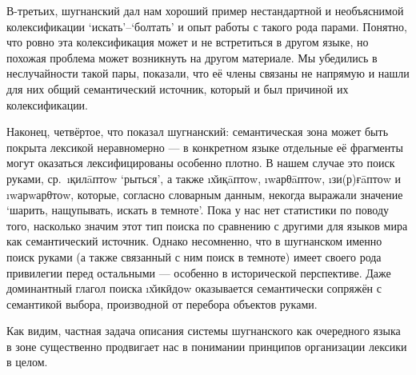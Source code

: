 В-третьих, шугнанский дал нам хороший пример нестандартной и необъяснимой колексификации ‘искать’–‘болтать’ и опыт работы с такого рода парами. Понятно, что ровно эта колексификация может и не встретиться в другом языке, но похожая проблема может возникнуть на другом материале. Мы убедились в неслучайности такой пары, показали, что её члены связаны не напрямую и нашли для них общий семантический источник, который и был причиной их колексификации.

\pagebreak[4]

Наконец, четвёртое, что показал шугнанский: семантическая зона может быть покрыта лексикой неравномерно — в конкретном языке отдельные её фрагменты могут оказаться лексифицированы особенно плотно. В нашем случае это поиск руками, ср.~\i{қилāптоw} ‘рыться’, а также \i{х̌иқāптоw}, \i{wарθāптоw}, \i{зи(р)ғāптоw} и \i{wарwарθтоw}, которые, согласно словарным данным, некогда выражали значение ‘шарить, нащупывать, искать в темноте’. Пока у нас нет статистики по поводу того, насколько значим этот тип поиска по сравнению с другими для языков мира как семантический источник. Однако несомненно, что в шугнанском именно поиск руками (а также связанный с ним поиск в темноте) имеет своего рода привилегии перед остальными — особенно в исторической перспективе. Даже доминантный глагол поиска \i{х̌икӣдоw} оказывается семантически сопряжён с семантикой выбора, производной от перебора объектов руками.

Как видим, частная задача описания системы шугнанского как очередного языка в зоне  существенно продвигает нас в понимании принципов организации лексики в целом.